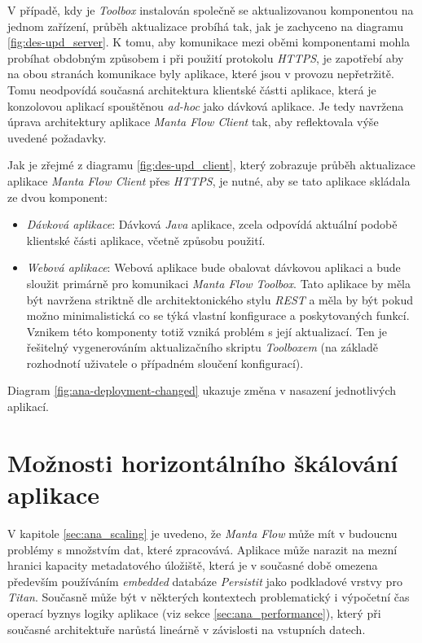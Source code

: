 V případě, kdy je \textit{Toolbox} instalován společně se aktualizovanou komponentou na jednom zařízení, průběh aktualizace probíhá tak, jak je zachyceno na diagramu \ref{fig:des-upd_server}. K tomu, aby komunikace mezi oběmi komponentami mohla probíhat obdobným způsobem i při použití protokolu \textit{HTTPS}, je zapotřebí aby na obou stranách komunikace byly aplikace, které jsou v provozu nepřetržitě. Tomu neodpovídá současná architektura klientské částti aplikace, která je konzolovou aplikací spouštěnou \textit{ad-hoc} jako dávková aplikace. Je tedy navržena úprava architektury aplikace \textit{Manta Flow Client} tak, aby reflektovala výše uvedené požadavky.

Jak je zřejmé z diagramu \ref{fig:des-upd_client}, který zobrazuje průběh aktualizace aplikace \textit{Manta Flow Client} přes \textit{HTTPS}, je nutné, aby se tato aplikace skládala ze dvou komponent:

\begin{itemize}
   \item{\textit{Dávková aplikace}}: Dávková \textit{Java} aplikace, zcela odpovídá aktuální podobě klientské části aplikace, včetně způsobu použití.
   \item{\textit{Webová aplikace}}: Webová aplikace bude obalovat dávkovou aplikaci a bude sloužit primárně pro komunikaci \textit{Manta Flow Toolbox}. Tato aplikace by měla být navržena striktně dle architektonického stylu \textit{REST} a měla by být pokud možno minimalistická co se týká vlastní konfigurace a poskytovaných funkcí. Vznikem této komponenty totiž vzniká problém s její aktualizací. Ten je řešitelný vygenerováním aktualizačního skriptu \textit{Toolboxem} (na základě rozhodnotí uživatele o případném sloučení konfigurací).
\end{itemize}

Diagram \ref{fig:ana-deployment-changed} ukazuje změna v nasazení jednotlivých aplikací.


\section{Možnosti horizontálního škálování aplikace}
\label{sec:des_scaling}
V kapitole \ref{sec:ana_scaling} je uvedeno, že \textit{Manta Flow} může mít v budoucnu problémy s množstvím dat, které zpracovává. Aplikace může narazit na mezní hranici kapacity metadatového úložiště, která je v současné době omezena především používáním \textit{embedded} databáze \textit{Persistit} jako podkladové vrstvy pro \textit{Titan}. Současně může být v některých kontextech problematický i výpočetní čas operací byznys logiky aplikace (viz sekce \ref{sec:ana_performance}), který při současné architektuře narůstá lineárně v závislosti na vstupních datech.

